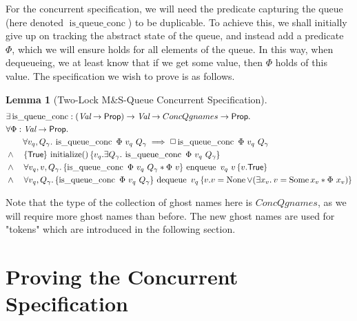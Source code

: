 \documentclass[twoside,11pt,openright]{report}
\newtheorem{lemma}[theorem]{Lemma}
\newcommand{\initialise}{\operatorname{initialize}}
\newcommand{\enqueue}{\operatorname{enqueue}}
\newcommand{\dequeue}{\operatorname{dequeue}}
\newcommand{\isqueueconc}{\operatorname{is\_queue\_conc}}
\begin{document}
For the concurrent specification, we will need the predicate capturing the queue (here denoted $\isqueueconc$) to be duplicable. To achieve this, we shall initially give up on tracking the abstract state of the queue, and instead add a predicate $\Phi$, which we will ensure holds for all elements of the queue. In this way, when dequeueing, we at least know that if we get some value, then $\Phi$ holds of this value. The specification we wish to prove is as follows.
\begin{lemma}[Two-Lock M\&S-Queue Concurrent Specification]\label{TLMSQ:spec:conc}
\begin{align*}
  &\Exists \isqueueconc : (\Val \to \Prop) \to \Val \to ConcQgnames \to \Prop.\\
  &\All \Phi : \Val \to \Prop.\\
  &\quad\quad \All v_q, Q_\gname . \isqueueconc \ \Phi \ v_q \ Q_\gname \implies \persistently \isqueueconc \ \Phi \ v_q \ Q_\gname\\
  &\land\quad\hoare{\TRUE}{\initialise \TT}{v_q . \Exists Q_\gname. \isqueueconc\ \Phi \ v_q \ Q_\gname}\\
  &\land\quad\All v_q, v, Q_\gname. \hoare{\isqueueconc \ \Phi \ v_q \ Q_\gname \star \Phi \ v}{\enqueue\ v_q\ v}{v . \TRUE}\\
  &\land\quad\All v_q, Q_\gname. \hoare{\isqueueconc \ \Phi \ v_q \ Q_\gname}{\dequeue\ v_q}{v . v = \None \lor (\Exists x_v. v = \Some x_v \star \Phi \ x_v)}
\end{align*}
\end{lemma}
Note that the type of the collection of ghost names here is $ConcQgnames$, as we will require more ghost names than before. The new ghost names are used for "tokens" which are introduced in the following section.

\section{Proving the Concurrent Specification}
\label{TLMSQ:section:concurrent-proof}
\end{document}

